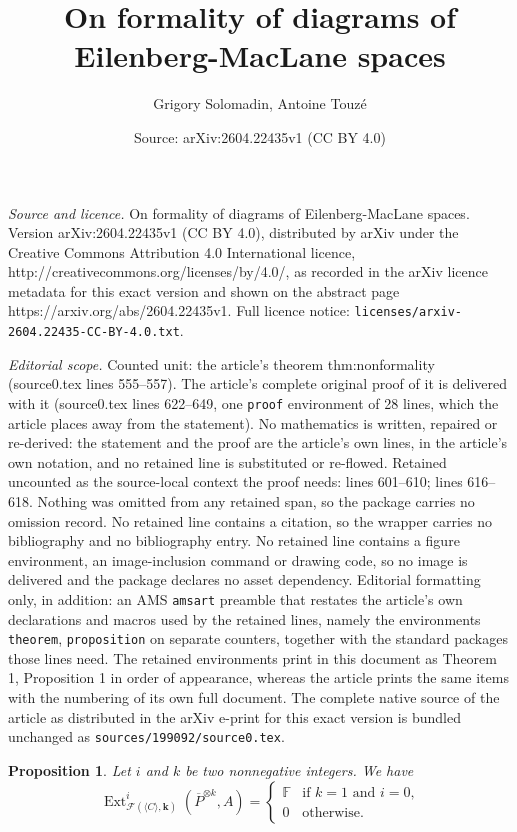 \documentclass[10pt,a4paper]{amsart}
\title{On formality of diagrams of Eilenberg-MacLane spaces}
\author{Grigory Solomadin, Antoine Touz\'e}
\date{Source: arXiv:2604.22435v1 (CC BY 4.0)}
\newtheorem{proposition}{Proposition}
\DeclareMathOperator{\Ext}{Ext}
\newcommand{\F}{\mathbb F}
\def\k{\mathbf{k}}
\begin{document}
\maketitle

\noindent\emph{Source and licence.} On formality of diagrams of Eilenberg-MacLane spaces. Version arXiv:2604.22435v1 (CC BY 4.0), distributed by arXiv under the Creative Commons Attribution 4.0 International licence, http://creativecommons.org/licenses/by/4.0/, as recorded in the arXiv licence metadata for this exact version and shown on the abstract page https://arxiv.org/abs/2604.22435v1. Full licence notice: \texttt{licenses/arxiv-2604.22435-CC-BY-4.0.txt}.\par\smallskip

\noindent\textit{Editorial scope.} Counted unit: the article's theorem thm:nonformality (source0.tex lines 555--557). The article's complete original proof of it is delivered with it (source0.tex lines 622--649, one \texttt{proof} environment of 28 lines, which the article places away from the statement). No mathematics is written, repaired or re-derived: the statement and the proof are the article's own lines, in the article's own notation, and no retained line is substituted or re-flowed.  Retained uncounted as the source-local context the proof needs: lines 601--610; lines 616--618.  Nothing was omitted from any retained span, so the package carries no omission record.  No retained line contains a citation, so the wrapper carries no bibliography and no bibliography entry.  No retained line contains a figure environment, an image-inclusion command or drawing code, so no image is delivered and the package declares no asset dependency.  Editorial formatting only, in addition: an AMS \texttt{amsart} preamble that restates the article's own declarations and macros used by the retained lines, namely the environments \texttt{theorem}, \texttt{proposition} on separate counters, together with the standard packages those lines need.  The retained environments print in this document as Theorem 1, Proposition 1 in order of appearance, whereas the article prints the same items with the numbering of its own full document.  The complete native source of the article as distributed in the arXiv e-print for this exact version is bundled unchanged as \texttt{sources/199092/source0.tex}.
\begin{proposition}\label{prop:Extcomputation1}
	Let $i$ and $k$ be two nonnegative integers. We have 
	\[
		\Ext^i_{\mathcal{F}(\langle C\rangle,\k)}(\overline{P}^{\otimes k},A)=
		\begin{cases}
			\F & \text{if $k=1$ and $i=0$,}\\
			0  & \text{otherwise.}
		\end{cases}
	\]
\end{proposition}
\end{document}
